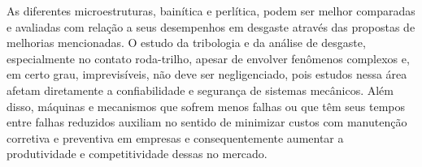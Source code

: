 \documentclass[
12pt,
openany, %
oneside, %
a4paper,			
english,			
brazil			        %
]{abntbibufjf}
\begin{document}
	As diferentes microestruturas, bainítica e perlítica, podem ser melhor comparadas e avaliadas com relação a seus desempenhos em desgaste através das propostas de melhorias mencionadas. O estudo da tribologia e da análise de desgaste, especialmente no contato roda-trilho, apesar de envolver fenômenos complexos e, em certo grau, imprevisíveis, não deve ser negligenciado, pois estudos nessa área afetam diretamente a confiabilidade e segurança de sistemas mecânicos. Além disso, máquinas e mecanismos que sofrem menos falhas ou que têm seus tempos entre falhas reduzidos auxiliam no sentido de minimizar custos com manutenção corretiva e preventiva em empresas e consequentemente aumentar a produtividade e competitividade dessas no mercado.
	
\postextual
	


\end{document}
